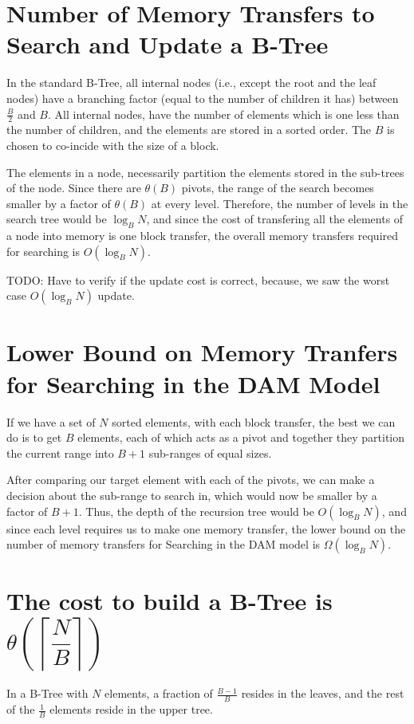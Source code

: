 \documentclass{article}
\begin{document}

\section {Number of Memory Transfers to Search and Update a B-Tree}
In the standard B-Tree, all internal nodes (i.e., except the root and 
the leaf nodes) have a branching factor (equal to the number of children it has) 
between $\frac{B}{2}$ and $B$. All internal nodes, have the number of
elements which is one less than the number of children, and the elements
are stored in a sorted order. The $B$ is chosen to co-incide with the size of
a block.

The elements in a node, necessarily partition
the elements stored in the sub-trees of the node. Since there are $\theta(B)$
pivots, the range of the search becomes smaller by a factor of $\theta(B)$ at
every level. Therefore, the number of levels in the search tree would be 
$\log_B{N}$, and since the cost of transfering all the elements of a node into
memory is one block transfer, the overall memory transfers required for searching
is $O(\log_B{N})$.

TODO: Have to verify if the update cost is correct, because, we saw the worst
case $O(\log_B{N})$ update.

\clearpage 

\section {Lower Bound on Memory Tranfers for Searching in the DAM Model}
If we have a set of $N$ sorted elements, with each block transfer, the best we can
do is to get $B$ elements, each of which acts as a pivot and together they partition
the current range into $B+1$ sub-ranges of equal sizes. 

After comparing our target element with each of the pivots, we can make a decision
about the sub-range to search in, which would now be smaller by a factor of $B+1$.
Thus, the depth of the recursion tree would be $O(\log_B{N})$, and since each level
requires us to make one memory transfer, the lower bound on the number of memory
transfers for Searching in the DAM model is $\Omega(\log_B{N})$.

\clearpage

\section {The cost to build a B-Tree is $\theta\left(\left\lceil\dfrac{N}{B}\right\rceil\right)$}
In a B-Tree with $N$ elements, a fraction of $\frac{B-1}{B}$ resides in the leaves, and
the rest of the $\frac{1}{B}$ elements reside in the upper tree. 
\end{document}
